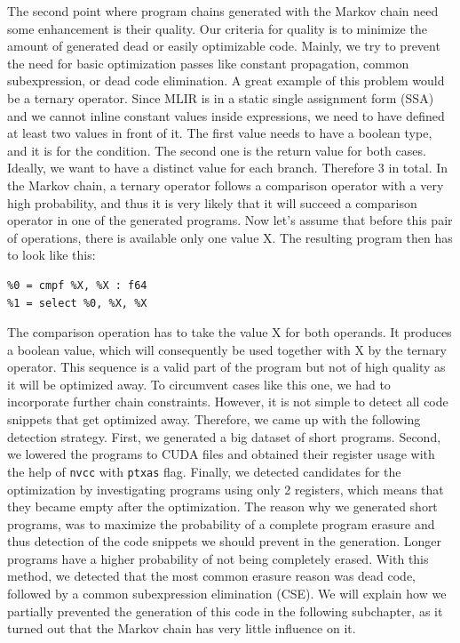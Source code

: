 \documentclass[sigplan,\review anonymous]{acmart}
\begin{document}
The second point where program chains generated with the Markov chain need
some enhancement is their quality. Our criteria for quality is to minimize
the amount of generated dead or easily optimizable code. Mainly, we try to
prevent the need for basic optimization passes like constant propagation,
common subexpression, or dead code elimination. A great example of this
problem would be a ternary operator. Since MLIR is in a static single
assignment form (SSA) and we cannot inline constant values inside expressions,
we need to have defined at least two values in front of it. The first value
needs to have a boolean type, and it is for the condition. The second one is
the return value for both cases. Ideally, we want to have a distinct value
for each branch. Therefore 3 in total. In the Markov chain, a ternary
operator follows a comparison operator with a very high probability, and
thus it is very likely that it will succeed a comparison operator in one
of the generated programs. Now let's assume that before this pair of
operations, there is available only one value X. The resulting program then
has to look like this:

\begin{lstlisting}
%0 = cmpf %X, %X : f64
%1 = select %0, %X, %X
\end{lstlisting}

The comparison operation has to take the value X for both operands. It produces
a boolean value, which will consequently be used together with X by the ternary
operator. This sequence is a valid part of the program but not of high quality
as it will be optimized away. To circumvent cases like this one, we had to
incorporate further chain constraints. However, it is not simple to detect all
code snippets that get optimized away. Therefore, we came up with the following
detection strategy. First, we generated a big dataset of short programs.
Second, we lowered the programs to CUDA files and obtained their register usage
with the help of \texttt{nvcc} with \texttt{ptxas} flag. Finally, we detected
candidates for the optimization by investigating programs using only 2
registers, which means that they became empty after the optimization. The
reason why we generated short programs, was to maximize the probability of a
complete program erasure and thus detection of the code snippets we should
prevent in the generation. Longer programs have a higher probability of not
being completely erased. With this method, we detected that the most common
erasure reason was dead code, followed by a common subexpression elimination
(CSE). We will explain how we partially prevented the generation of this code
in the following subchapter, as it turned out that the Markov chain has very
little influence on it.
\end{document}
